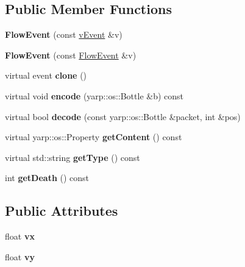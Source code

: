 \subsection*{Public Member Functions}
\begin{DoxyCompactItemize}
\item 
{\bfseries Flow\+Event} (const \hyperlink{classev_1_1vEvent}{v\+Event} \&v)\hypertarget{classev_1_1FlowEvent_aa268bbbeb75a7ec0634e7eff9bf9dda5}{}\label{classev_1_1FlowEvent_aa268bbbeb75a7ec0634e7eff9bf9dda5}

\item 
{\bfseries Flow\+Event} (const \hyperlink{classev_1_1FlowEvent}{Flow\+Event} \&v)\hypertarget{classev_1_1FlowEvent_a0784e0ce0b0b1fb1d9c61f8134efa70b}{}\label{classev_1_1FlowEvent_a0784e0ce0b0b1fb1d9c61f8134efa70b}

\item 
virtual event {\bfseries clone} ()\hypertarget{classev_1_1FlowEvent_a6a108ba6028ea69a9398745074d7300f}{}\label{classev_1_1FlowEvent_a6a108ba6028ea69a9398745074d7300f}

\item 
virtual void {\bfseries encode} (yarp\+::os\+::\+Bottle \&b) const \hypertarget{classev_1_1FlowEvent_a13c900d7027a67d8197e32d56e92e0b0}{}\label{classev_1_1FlowEvent_a13c900d7027a67d8197e32d56e92e0b0}

\item 
virtual bool {\bfseries decode} (const yarp\+::os\+::\+Bottle \&packet, int \&pos)\hypertarget{classev_1_1FlowEvent_a47a44a03752d3d0b5de668bfa8092d43}{}\label{classev_1_1FlowEvent_a47a44a03752d3d0b5de668bfa8092d43}

\item 
virtual yarp\+::os\+::\+Property {\bfseries get\+Content} () const \hypertarget{classev_1_1FlowEvent_a299486f89e1f893a513d237fd70ba00c}{}\label{classev_1_1FlowEvent_a299486f89e1f893a513d237fd70ba00c}

\item 
virtual std\+::string {\bfseries get\+Type} () const \hypertarget{classev_1_1FlowEvent_a181159b6f05391e438b4a68908e572fb}{}\label{classev_1_1FlowEvent_a181159b6f05391e438b4a68908e572fb}

\item 
int {\bfseries get\+Death} () const \hypertarget{classev_1_1FlowEvent_ac39faf9016620faaddccd6c15b9f513f}{}\label{classev_1_1FlowEvent_ac39faf9016620faaddccd6c15b9f513f}

\end{DoxyCompactItemize}
\subsection*{Public Attributes}
\begin{DoxyCompactItemize}
\item 
float {\bfseries vx}\hypertarget{classev_1_1FlowEvent_a614490d12ab9767e546e2929a4c7a65e}{}\label{classev_1_1FlowEvent_a614490d12ab9767e546e2929a4c7a65e}

\item 
float {\bfseries vy}\hypertarget{classev_1_1FlowEvent_a20416e333c9f0258a2a1bbb49fb14989}{}\label{classev_1_1FlowEvent_a20416e333c9f0258a2a1bbb49fb14989}

\end{DoxyCompactItemize}
